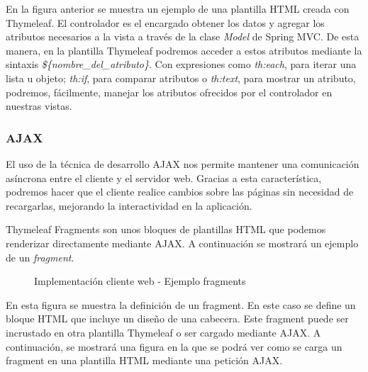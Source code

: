 En la figura anterior se muestra un ejemplo de una plantilla HTML creada con Thymeleaf. El controlador es el encargado obtener los datos y agregar los atributos necesarios a la vista a través de la clase \textit{Model} de Spring MVC. De esta manera, en la plantilla Thymeleaf podremos acceder a estos atributos mediante la sintaxis \textit{\$\{nombre\_del\_atributo\}}. Con expresiones como \textit{th:each}, para iterar una lista u objeto; \textit{th:if}, para comparar atributos o \textit{th:text}, para mostrar un atributo, podremos, fácilmente, manejar los atributos ofrecidos por el controlador en nuestras vistas. 


\subsubsection*{AJAX}
El uso de la técnica de desarrollo AJAX nos permite mantener una comunicación asíncrona entre el cliente y el servidor web. Gracias a esta característica, podremos hacer que el cliente realice cambios sobre las páginas sin necesidad de recargarlas, mejorando la interactividad en la aplicación.

Thymeleaf Fragments son unos bloques de plantillas HTML que podemos renderizar directamente mediante AJAX. A continuación se mostrará un ejemplo de un \textit{fragment}.

\begin{figure}[H]
\centering
{}
\caption{Implementación cliente web - Ejemplo fragments}
\end{figure}

En esta figura se muestra la definición de un fragment. En este caso se define un bloque HTML que incluye un diseño de una cabecera. Este fragment puede ser incrustado en otra plantilla Thymeleaf o ser cargado mediante AJAX. A continuación, se mostrará una figura en la que se podrá ver como se carga un fragment en una plantilla HTML mediante una petición AJAX.

